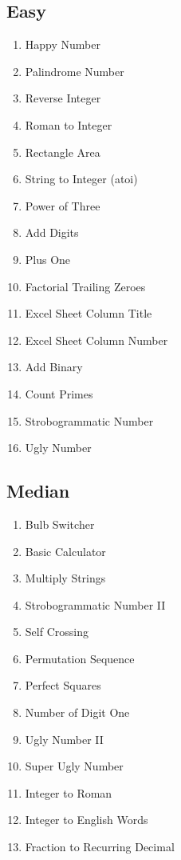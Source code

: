 \documentclass[DIV=calc, paper=a4, fontsize=11pt, twocolumn]{scrartcl}	 %
\begin{document}

\subsection*{Easy}
\begin{enumerate}
\item Happy Number    \cite{202}
\item Palindrome Number \cite{009}
\item Reverse Integer \cite{007}
\item Roman to Integer   \cite{013}
\item Rectangle Area \cite{223}
\item String to Integer (atoi) \cite{008}
\item Power of Three   \cite{326}
\item Add Digits   \cite{258}
\item Plus One    \cite{066}
\item Factorial Trailing Zeroes   \cite{172}
\item Excel Sheet Column Title    \cite{168}
\item Excel Sheet Column Number   \cite{171}
\item Add Binary \cite{067}
\item Count Primes   \cite{204}
\item Strobogrammatic Number \cite{246}
\item Ugly Number    \cite{263}
\end{enumerate}

\subsection*{Median}
\begin{enumerate}
\item Bulb Switcher   \cite{319}
\item Basic Calculator    \cite{224}
\item Multiply Strings   \cite{043}
\item Strobogrammatic Number II  \cite{247}
\item Self Crossing  \cite{335}
\item Permutation Sequence  \cite{060}
\item Perfect Squares   \cite{279}
\item Number of Digit One   \cite{233}
\item Ugly Number II    \cite{264}
\item Super Ugly Number \cite{313}
\item Integer to Roman \cite{012}
\item Integer to English Words \cite{273}
\item Fraction to Recurring Decimal    \cite{166}
\end{enumerate}
\end{document}
